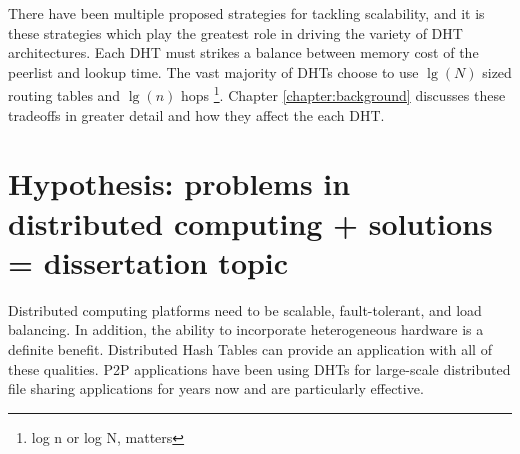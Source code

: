 \documentclass[10pt,letterpaper,twoside]{report}
\begin{document}
There have been multiple proposed strategies for tackling scalability, and it is these strategies which play the greatest role in driving the variety of DHT architectures. 
Each DHT must strikes a balance between memory cost of the peerlist and lookup time. 
The vast majority of DHTs choose to use $\lg(N)$ sized routing tables and  $\lg(n)$ hops \footnote{log n or log N, matters}. 
Chapter \ref{chapter:background} discusses these tradeoffs in greater detail and how they affect the each DHT.







\section{Hypothesis:  problems in distributed computing + solutions =  dissertation topic}
Distributed computing platforms need to be scalable, fault-tolerant, and load balancing.
In addition, the ability to incorporate heterogeneous hardware is a definite benefit.
Distributed Hash Tables can provide an application with all of these qualities.
P2P applications have been using DHTs for large-scale distributed file sharing applications for years now and are particularly effective.
\end{document}
